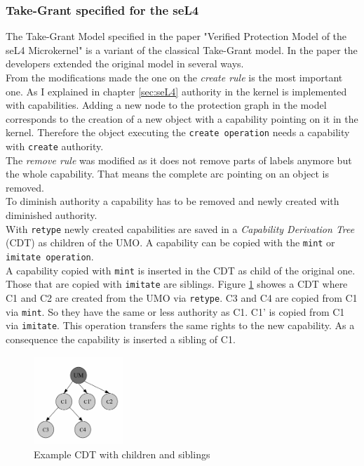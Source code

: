 \subsubsection{Take-Grant specified for the seL4}\label{specT}
The Take-Grant Model specified in the paper "Verified Protection Model of the seL4 Microkernel" \cite{TakeG} is a variant of the classical Take-Grant model. In the paper the developers extended the original model in several ways. \\
From the modifications made the one on the \textit{create rule} is the most important one. As I explained in chapter \ref{sec:seL4} authority in the kernel is implemented with capabilities. Adding a new node to the protection graph in the model corresponds to the creation of a new object with a capability pointing on it in the kernel. Therefore the object executing the \texttt{create operation} needs a capability with \texttt{create} authority. \\
The \textit{remove rule} was modified as it does not remove parts of labels anymore but the whole capability. That means the complete arc pointing on an object is removed. \\
To diminish authority a capability has to be removed and newly created with diminished authority. \\
With \texttt{retype} newly created capabilities are saved in a \textit{Capability Derivation Tree} (CDT) as children of the UMO. A capability can be copied with the \texttt{mint} or \texttt{imitate operation}. \\ 
A capability  copied with \texttt{mint} is inserted in the CDT as child of the original one. Those that are copied with \texttt{imitate} are siblings. Figure \ref{fig:cdt} showes a CDT where C1 and C2 are created from the UMO via \texttt{retype}. C3 and C4 are copied from C1 via \texttt{mint}. So they have the same or less authority as C1. C1' is copied from C1 via \texttt{imitate}. This operation transfers the same rights to the new capability. As a consequence the capability is inserted a sibling of C1. \\
	\begin{figure}[H]
	\centering
	\includegraphics[width=0.3\textwidth]{./Pictures/CDT.jpg}
	\caption[CDT]{Example CDT with children and siblings \cite{PhDseL4}}
	\label{fig:cdt}
	\end{figure}
